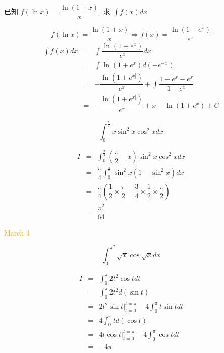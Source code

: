 \begin{example}[][Exam: 29.1.5]
	已知 $f(\ln x)=\dfrac{\ln(1+x)}{x}$, 求 $\int f(x)dx$
\end{example}
\begin{solution}
	$$f(\ln x) = \dfrac{\ln(1+x)}{x}\Rightarrow f(x) = \dfrac{\ln(1+e^{x})}{e^{x}}$$
	\begin{eqnarray*}
		\int f(x) dx & = & \int \dfrac{\ln (1+e^{x})}{e^{x}}dx \\
					 & = & \int \ln(1+e^{x})d(-e^{-x})\\
					 & = & -\dfrac{\ln(1+e^{x]})}{e^{x}} + \int \dfrac{1+e^{x}-e^{x}}{1+e^{x}}\\
					 & = & -\dfrac{\ln(1+e^{x]})}{e^{x}} + x - \ln(1+e^{x}) + C
	\end{eqnarray*}
\end{solution}
\begin{example}[][Exam: 29.1.6]
	$$\int_{0}^{\frac{\pi}{2}}x\sin^{2}x\cos^{2}xdx$$
\end{example}
\begin{solution}
	\begin{eqnarray*}
		I & = & \int_{0}^{\frac{\pi}{2}}(\dfrac{\pi}{2}-x)\sin^{2}x\cos^{2}xdx\\
		  & = & \dfrac{\pi}{4}\int_{0}^{\frac{\pi}{2}}\sin^{2}x(1-\sin^{2}x)dx\\
		  & = & \dfrac{\pi}{4}(\dfrac{1}{2}\times \dfrac{\pi}{2} - \dfrac{3}{4}\times \dfrac{1}{2}\times \dfrac{\pi}{2})\\
		  & = & \dfrac{\pi^{2}}{64}
	\end{eqnarray*}
\end{solution}

\textcolor{orange}{March 4}

\begin{example}[][Exam: 29.1.7]
	$$\int_{0}^{\pi^{2}}\sqrt{x}\cos\sqrt{x}dx$$
\end{example}
\begin{solution}
	\begin{eqnarray*}
		I & = & \int_{0}^{\pi}2t^{2}\cos tdt\\
		  & = & \int_{0}^{\pi}2t^{2}d(\sin t)\\
		  & = & 2t^{2}\sin t\big|_{t = 0}^{t = \pi} - 4\int_{0}^{\pi}t\sin tdt\\
		  & = & 4\int_{0}^{\pi}td(\cos t)\\
		  & = & 4t\cos t\big|_{t = 0}^{t = \pi} - 4\int_{0}^{\pi}\cos tdt\\
		  & = & -4\pi
	\end{eqnarray*}
\end{solution}

